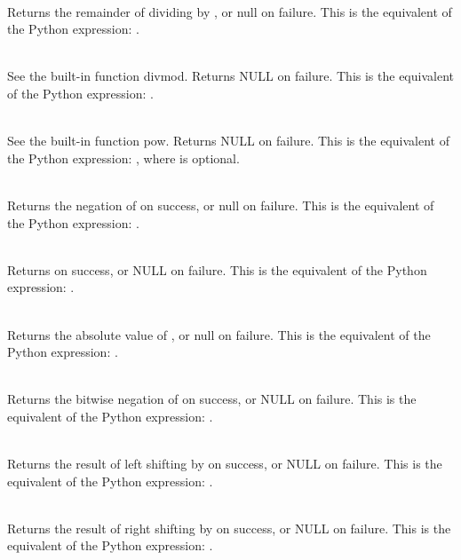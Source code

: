      \\
	 Returns the remainder of dividing  by , or null on
	 failure.  This is the equivalent of the Python expression:
	 .


     \\
	 See the built-in function divmod.  Returns NULL on failure.
	 This is the equivalent of the Python expression:
	 .


     \\
	 See the built-in function pow.  Returns NULL on failure.
	 This is the equivalent of the Python expression:
	 , where  is optional.


     \\
	 Returns the negation of  on success, or null on failure.
	 This is the equivalent of the Python expression: .


     \\
         Returns  on success, or NULL on failure.
	 This is the equivalent of the Python expression: .


     \\
	 Returns the absolute value of , or null on failure.  This is
	 the equivalent of the Python expression: .


     \\
	 Returns the bitwise negation of  on success, or NULL on
	 failure.  This is the equivalent of the Python expression:
	 .


     \\
	 Returns the result of left shifting  by  on success, or
	 NULL on failure.  This is the equivalent of the Python
	 expression: .


     \\
	 Returns the result of right shifting  by  on success, or
	 NULL on failure.  This is the equivalent of the Python
	 expression: .


